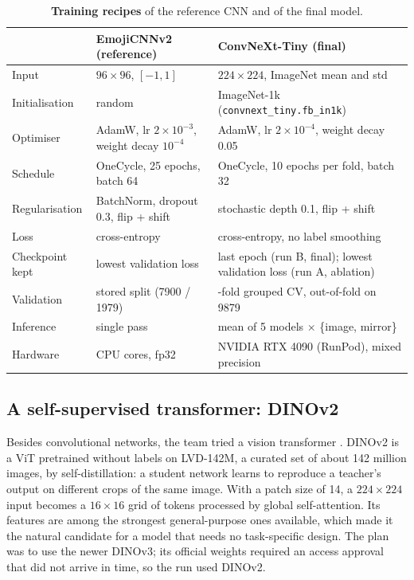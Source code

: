 \documentclass[11pt,a4paper]{article}
\begin{document}
\begin{table}[t]
\centering\small
\caption{\textbf{Training recipes} of the reference CNN and of the final model.}
\label{tab:recipe}
\begin{tabularx}{\textwidth}{@{}l>{\raggedright\arraybackslash}X>{\raggedright\arraybackslash}X@{}}
\toprule
 & EmojiCNNv2 (reference) & ConvNeXt-Tiny (final)\\
\midrule
Input & $96\times96$, $[-1,1]$ & $224\times224$, ImageNet mean and std\\
Initialisation & random & ImageNet-1k (\texttt{convnext\_tiny.fb\_in1k})\\
Optimiser & AdamW, lr $2\times10^{-3}$, weight decay $10^{-4}$ & AdamW, lr $2\times10^{-4}$, weight decay 0.05\\
Schedule & OneCycle, 25 epochs, batch 64 & OneCycle, 10 epochs per fold, batch 32\\
Regularisation & BatchNorm, dropout 0.3, flip + shift & stochastic depth 0.1, flip + shift\\
Loss & cross-entropy & cross-entropy, no label smoothing\\
Checkpoint kept & lowest validation loss & last epoch (run B, final); lowest validation loss (run A, ablation)\\
Validation & stored split (\num{7900} / \num{1979}) & 5-fold grouped CV, out-of-fold on \num{9879}\\
Inference & single pass & mean of 5 models $\times$ \{image, mirror\}\\
Hardware & 2 CPU cores, fp32 & NVIDIA RTX 4090 (RunPod), mixed precision\\
\bottomrule
\end{tabularx}
\end{table}

\subsection{A self-supervised transformer: DINOv2}
\label{sec:dino}
Besides convolutional networks, the team tried a vision transformer \cite{dosovitskiy2021vit}. DINOv2 \cite{oquab2024dinov2} is a ViT pretrained without labels on LVD-142M, a curated set of about 142 million images, by self-distillation: a student network learns to reproduce a teacher's output on different crops of the same image. With a patch size of 14, a $224\times224$ input becomes a $16\times16$ grid of tokens processed by global self-attention. Its features are among the strongest general-purpose ones available, which made it the natural candidate for a model that needs no task-specific design. The plan was to use the newer DINOv3; its official weights required an access approval that did not arrive in time, so the run used DINOv2.
\end{document}
